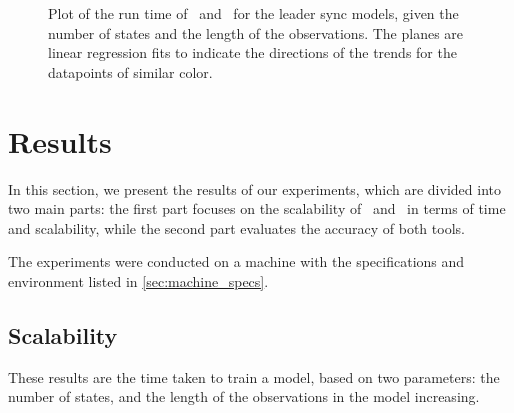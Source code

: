 \begin{figure*}[htb!]
    \centering
    
    \caption{Plot of the run time of \Jajapy\ and \Cupaal\ for the leader sync models, given the number of states and the length of the observations. The planes are linear regression fits to indicate the directions of the trends for the datapoints of similar color.}
    \label{fig:leader_results}
\end{figure*}

\section{Results}\label{sec:results}
In this section, we present the results of our experiments, which are divided into two main parts: the first part focuses on the scalability of \Jajapy\ and \Cupaal\ in terms of time and scalability, while the second part evaluates the accuracy of both tools.

The experiments were conducted on a machine with the specifications and environment listed in \autoref{sec:machine_specs}.


\subsection{Scalability}\label{subsec:scalability}
These results are the time taken to train a model, based on two parameters: the number of states, and the length of the observations in the model increasing.


